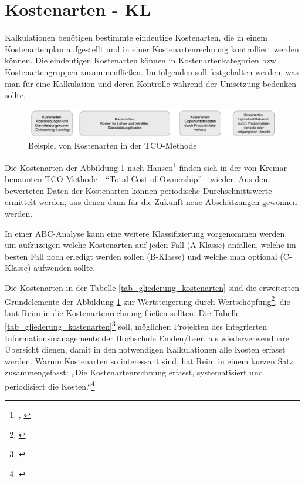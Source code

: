 
\section{Kostenarten - KL}

\label{section_kostenarten}
Kalkulationen benötigen bestimmte eindeutige Kostenarten, die in einem Kostenartenplan aufgestellt und in einer Kostenartenrechnung kontrolliert werden können. Die eindeutigen Kostenarten können in Kostenartenkategorien bzw. Kostenartengruppen zusammenfließen. Im folgenden soll festgehalten werden, was man für eine Kalkulation und deren Kontrolle w\"ahrend der Umsetzung bedenken sollte.

\begin{figure}[h!]
	\centering
	\includegraphics[width=\textwidth]{kapitel/gruppe4_2/bilder/beispiel_kostenarten_TCO}
	\caption{Beispiel von Kostenarten in der TCO-Methode}
	\label{fig_kostenarten_TCO}
\end{figure}

Die Kostenarten der Abbildung \ref{fig_kostenarten_TCO} nach Hansen\footnote{\autocite[495]{hansen_business_2009}, \autocite[Vgl.][314, 355]{muller2013betriebswirtschaftslehre}} finden sich in der von Krcmar benannten TCO-Methode - \enquote{Total Cost of Ownership} - wieder. Aus den bewerteten Daten der Kostenarten können periodische Durchschnittswerte ermittelt werden, aus denen dann für die Zukunft neue Abschätzungen gewonnen werden.

\clearpage

In einer ABC-Analyse kann eine weitere Klassifizierung vorgenommen werden, um aufzuzeigen welche Kostenarten auf jeden Fall (A-Klasse) anfallen, welche im besten Fall noch erledigt werden sollen (B-Klasse) und welche man optional (C-Klasse) aufwenden sollte.

Die Kostenarten in der Tabelle \ref{tab_gliederung_kostenarten} sind die erweiterten Grundelemente der Abbildung \ref{fig_kostenarten_TCO} zur Wertsteigerung durch Wertschöpfung\footnote{\autocite[125-128]{reim_erfolgsrechnung_2015}}, die laut Reim in die Kostenartenrechnung fließen sollten. Die Tabelle \ref{tab_gliederung_kostenarten}\footnote{\autocite[138]{reim_erfolgsrechnung_2015}} soll, m\"oglichen Projekten des integrierten Informationsmanagements der Hochschule Emden/Leer, als wiederverwendbare Übersicht dienen, damit in den notwendigen Kalkulationen alle Kosten erfasst werden. Warum Kostenarten so interessant sind, hat Reim in einem kurzen Satz zusammengefasst: „Die Kostenartenrechnung erfasst, systematisiert und periodisiert die Kosten.“\footnote{\autocite[137-147]{reim_erfolgsrechnung_2015}} 


